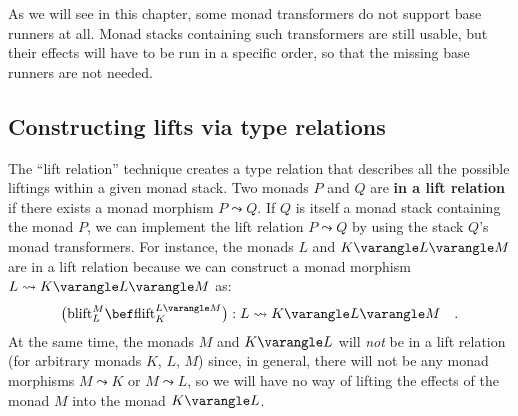 As we will see in this chapter, some monad transformers do not support
base runners at all. Monad stacks containing such transformers are
still usable, but their effects will have to be run in a specific
order, so that the missing base runners are not needed.

\subsection{Constructing lifts via type relations\label{subsec:Constructing-lifts-via-type-relations}}

The \textsf{``}lift
relation\textsf{''} technique creates a type relation
that describes all the possible liftings within a given monad stack.
Two monads $P$ and $Q$ are \textbf{in a lift relation} if there
exists a monad morphism $P\leadsto Q$. If $Q$ is itself a monad
stack containing the monad $P$, we can implement the lift relation
$P\leadsto Q$ by using the stack $Q$\textsf{'}s monad transformers. For instance,
the monads $L$ and $K\varangle L\varangle M$ are in a lift relation
because we can construct a monad morphism $L\leadsto K\varangle L\varangle M$
as:
\[
\big(\text{blift}_{L}^{M}\bef\text{flift}_{K}^{L\varangle M}\big):L\leadsto K\varangle L\varangle M\quad.
\]
At the same time, the monads $M$ and $K\varangle L$ will \emph{not}
be in a lift relation (for arbitrary monads $K$, $L$, $M$) since,
in general, there will not be any monad morphisms $M\leadsto K$ or
$M\leadsto L$, so we will have no way of lifting the effects of the
monad $M$ into the monad $K\varangle L$.

